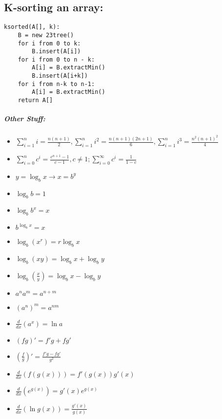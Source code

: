 \documentclass{article}
\begin{document}
\subsection*{K-sorting an array: }
\begin{lstlisting}
ksorted(A[], k):
    B = new 23tree()
    for i from 0 to k:
        B.insert(A[i])
    for i from 0 to n - k:
        A[i] = B.extractMin()
        B.insert(A[i+k])
    for i from n-k to n-1:
        A[i] = B.extractMin()
    return A[]
\end{lstlisting}

\subparagraph*{Other Stuff:}
\begin{itemize}
    \item[] \(\sum\limits_{i=1}^{n}i = \frac{n(n+1)}{2},\sum\limits_{i=1}^{n}i^2 = \frac{n(n+1)(2n+1)}{6}, \sum\limits_{i=1}^{n} i^3 = \frac{n^2(n+1)^2}{4}\)
    \item[] \(\sum\limits_{i=0}^{n}c^i = \frac{c^{n+1}-1}{c-1}, c \neq 1; \sum\limits_{i=0}^{\infty}c^i = \frac{1}{1-c}\)
    \item[] \(y = \log_bx \rightarrow x = b^y\)
    \item[] \(\log_bb = 1\)
    \item[] \(\log_bb^x = x\)
    \item[] \(b^{\log_bx}=x\)
    \item[] \(\log_b(x^r)=r\log_bx\)
    \item[] \(\log_b(xy) = \log_bx+\log_by\)
    \item[] \(\log_b\left(\frac{x}{y}\right)=\log_bx-\log_by\)
    \item[] \(a^n a^m = a^{n+m}\)
    \item[] \((a^n)^m = a^{nm}\)
    \item[] \(\frac{d}{dx}(a^x) = \ln a\)
    \item[] \((fg)' = f'g + fg'\)
    \item[] \(\left(\frac{f}{g}\right)' = \frac{f'g-fg'}{g^2}\)
    \item[] \(\frac{d}{dx}(f(g(x)))=f'(g(x))g'(x)\)
    \item[] \(\frac{d}{dx}(e^{g(x)})= g'(x)e^{g(x)}\)
    \item[] \(\frac{d}{dx}(\ln g(x)) = \frac{g'(x)}{g(x)}\)
\end{itemize}
\end{document}
